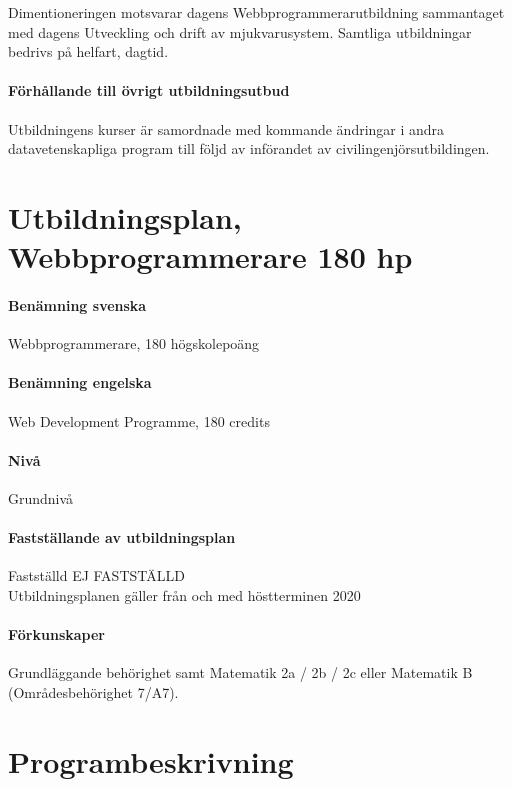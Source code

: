 \documentclass[swedish]{LnuCmThesis}
\begin{document}
Dimentioneringen motsvarar dagens Webbprogrammerarutbildning sammantaget med dagens Utveckling och drift av mjukvarusystem. Samtliga utbildningar bedrivs på helfart, dagtid.

\paragraph{Förhållande till övrigt utbildningsutbud}
Utbildningens kurser är samordnade med kommande ändringar i andra datavetenskapliga program till följd av införandet av civilingenjörsutbildingen.

\clearpage

\section*{Utbildningsplan, Webbprogrammerare 180 hp}
\paragraph{Benämning svenska}

Webbprogrammerare, 180 högskolepoäng

\paragraph{Benämning engelska}

Web Development Programme, 180 credits

\paragraph{Nivå}

Grundnivå

\paragraph{Fastställande av utbildningsplan}

Fastställd EJ FASTSTÄLLD\\
Utbildningsplanen gäller från och med höstterminen 2020

\paragraph{Förkunskaper}

Grundläggande behörighet samt Matematik 2a / 2b / 2c eller Matematik B\\
(Områdesbehörighet 7/A7).

\section*{Programbeskrivning}
\end{document}

